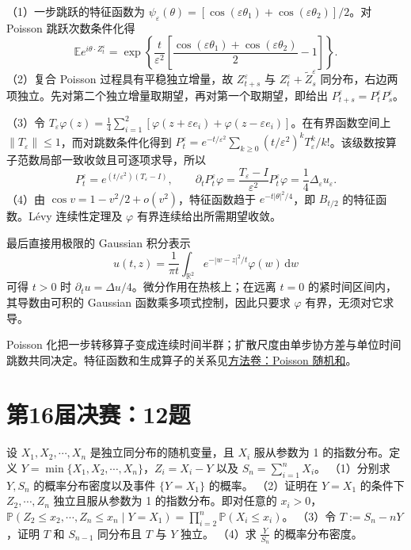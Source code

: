 \documentclass[UTF8,12pt,a4paper,fontset=fandol]{ctexbook}
\begin{document}
\begin{solve}

（1）一步跳跃的特征函数为 $\psi_\varepsilon(\theta)=[\cos(\varepsilon\theta_1)+\cos(\varepsilon\theta_2)]/2$。对 Poisson 跳跃次数条件化得
\[
\mathbb E e^{i\theta\cdot Z_t^\varepsilon}
=\exp\left\{\frac t{\varepsilon^2}
\left[\frac{\cos(\varepsilon\theta_1)+\cos(\varepsilon\theta_2)}2-1\right]\right\}.
\]
（2）复合 Poisson 过程具有平稳独立增量，故 $Z_{t+s}^\varepsilon$ 与 $Z_t^\varepsilon+\widetilde Z_s^\varepsilon$ 同分布，右边两项独立。先对第二个独立增量取期望，再对第一个取期望，即给出 $P_{t+s}^\varepsilon=P_t^\varepsilon P_s^\varepsilon$。

（3）令 $T_\varepsilon\varphi(z)=\frac14\sum_{i=1}^2[\varphi(z+\varepsilon e_i)+\varphi(z-\varepsilon e_i)]$。在有界函数空间上 $\|T_\varepsilon\|\le1$，而对跳数条件化得到 $P_t^\varepsilon=e^{-t/\varepsilon^2}\sum_{k\ge0}(t/\varepsilon^2)^kT_\varepsilon^k/k!$。该级数按算子范数局部一致收敛且可逐项求导，所以
\[
P_t^\varepsilon=e^{(t/\varepsilon^2)(T_\varepsilon-I)},\qquad
\partial_tP_t^\varepsilon\varphi=\frac{T_\varepsilon-I}{\varepsilon^2}P_t^\varepsilon\varphi
=\frac14\Delta_\varepsilon u_\varepsilon.
\]
（4）由 $\cos v=1-v^2/2+o(v^2)$，特征函数趋于 $e^{-t|\theta|^2/4}$，即 $B_{t/2}$ 的特征函数。Lévy 连续性定理及 $\varphi$ 有界连续给出所需期望收敛。

最后直接用极限的 Gaussian 积分表示
\[
u(t,z)=\frac1{\pi t}\int_{\mathbb R^2}e^{-|w-z|^2/t}\varphi(w)\,\mathrm dw
\]
可得 $t>0$ 时 $\partial_tu=\Delta u/4$。微分作用在热核上；在远离 $t=0$ 的紧时间区间内，其导数由可积的 Gaussian 函数乘多项式控制，因此只要求 $\varphi$ 有界，无须对它求导。

\end{solve}

\begin{remark}[方法与条件]

Poisson 化把一步转移算子变成连续时间半群；扩散尺度由单步协方差与单位时间跳数共同决定。特征函数和生成算子的关系见\hyperref[app:probability-poisson]{方法卷：Poisson 随机和}。

\end{remark}

\section{第16届决赛：12题}\label{pr:fin16-high:12}

\begin{example}[公开题解转录]\label{q:fin16-high:12}

设 $X_1,X_2,\cdots,X_n$ 是独立同分布的随机变量，且 $X_i$ 服从参数为 1 的指数分布。定义 $Y = \min\{X_1,X_2,\cdots,X_n\}$，$Z_i = X_i - Y$ 以及 $S_n = \sum_{i=1}^{n}X_i$。
（1）分别求 $Y,S_n$ 的概率分布密度以及事件 $\{Y = X_1\}$ 的概率。
（2）证明在 $Y = X_1$ 的条件下 $Z_2,\cdots,Z_n$ 独立且服从参数为 1 的指数分布。即对任意的 $x_i > 0$，$\mathbb{P}(Z_2 \leq x_2,\cdots,Z_n \leq x_n \mid Y = X_1) = \prod_{i=2}^{n}\mathbb{P}(X_i \leq x_i)$。
（3）令 $T := S_n - nY$，证明 $T$ 和 $S_{n-1}$ 同分布且 $T$ 与 $Y$ 独立。
（4）求 $\frac{Y}{S_n}$ 的概率分布密度。

\end{example}
\end{document}
